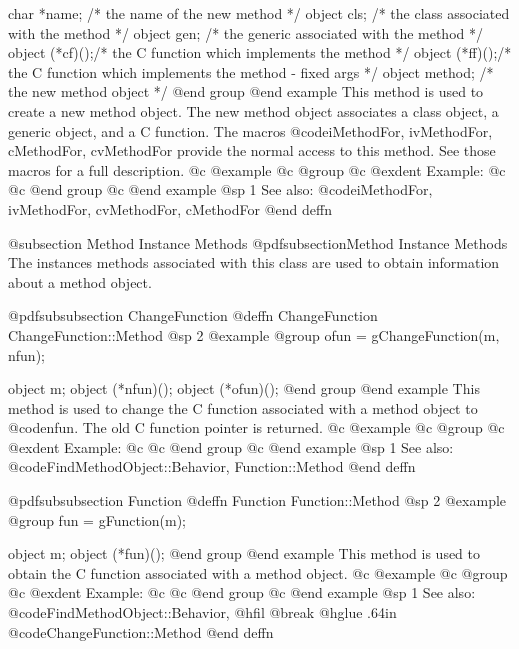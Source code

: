 char    *name;  /*  the name of the new method   */
object  cls;    /*  the class associated with the method  */
object  gen;    /*  the generic associated with the method  */
object  (*cf)();/*  the C function which implements 
                              the method  */
object  (*ff)();/*  the C function which implements 
                              the method - fixed args  */
object  method; /*  the new method object  */
@end group
@end example
This method is used to create a new method object.  The new method
object associates a class object, a generic object, and a C function.
The macros @code{iMethodFor, ivMethodFor, cMethodFor, cvMethodFor}
provide the normal access to this method.  See those macros for a
full description.
@c @example
@c @group
@c @exdent Example:
@c 
@c @end group
@c @end example
@sp 1
See also:  @code{iMethodFor, ivMethodFor, cvMethodFor, cMethodFor}
@end deffn






@subsection Method Instance Methods
@pdfsubsection{Method Instance Methods}
The instances methods associated with this class are used to obtain
information about a method object.





@pdfsubsubsection {ChangeFunction}
@deffn {ChangeFunction} ChangeFunction::Method
@sp 2
@example
@group
ofun = gChangeFunction(m, nfun);

object  m;
object  (*nfun)();
object  (*ofun)();
@end group
@end example
This method is used to change the C function associated with a method
object to @code{nfun}.  The old C function pointer is returned.
@c @example
@c @group
@c @exdent Example:
@c 
@c @end group
@c @end example
@sp 1
See also:  @code{FindMethodObject::Behavior, Function::Method}
@end deffn










@pdfsubsubsection {Function}
@deffn {Function} Function::Method
@sp 2
@example
@group
fun = gFunction(m);

object  m;
object  (*fun)();
@end group
@end example
This method is used to obtain the C function associated with a method
object.
@c @example
@c @group
@c @exdent Example:
@c 
@c @end group
@c @end example
@sp 1
See also:  @code{FindMethodObject::Behavior,}
@hfil @break @hglue .64in      @code{ChangeFunction::Method}
@end deffn







